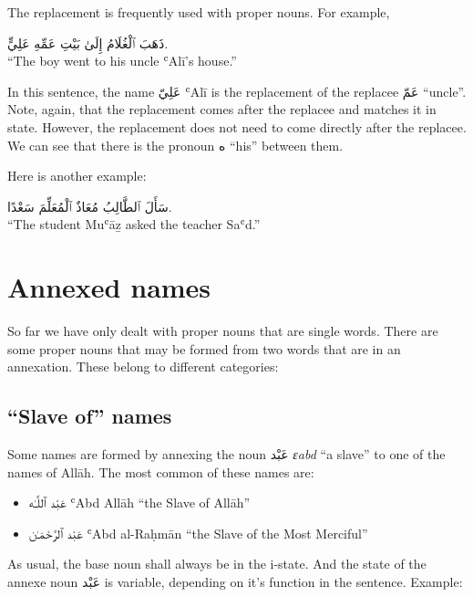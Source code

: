 \documentclass[
  10pt,
]{book}
\providecommand{\tightlist}{%
  \setlength{\itemsep}{0pt}\setlength{\parskip}{0pt}}
\begin{document}
The replacement is frequently used with proper nouns. For example,

\foreignlanguage{arabic}{ذَهَبَ ٱلْغُلَامُ إِلَىٰ بَيْتِ عَمِّهِ عَلِيٍّ.}\\
\enquote{The boy went to his uncle ʿAlī's house.}

In this sentence, the name \foreignlanguage{arabic}{عَلِيّ} ʿAlī is the replacement of the replacee \foreignlanguage{arabic}{عَمّ} \enquote{uncle}. Note, again, that the replacement comes after the replacee and matches it in state. However, the replacement does not need to come directly after the replacee. We can see that there is the pronoun \foreignlanguage{arabic}{ه} \enquote{his} between them.

Here is another example:

\foreignlanguage{arabic}{سَأَلَ ٱلطَّالِبُ مُعَاذٌ ٱلْمُعَلِّمَ سَعْدًا.}\\
\enquote{The student Muʿāẕ asked the teacher Saʿd.}

\section{Annexed names}\label{annexed-names}

So far we have only dealt with proper nouns that are single words. There are some proper nouns that may be formed from two words that are in an annexation. These belong to different categories:

\subsection{\texorpdfstring{\enquote{Slave of} names}{``Slave of'' names}}\label{slave-of-names}

Some names are formed by annexing the noun \foreignlanguage{arabic}{عَبْد} \emph{ɛabd} \enquote{a slave} to one of the names of Allāh. The most common of these names are:

\begin{itemize}
\tightlist
\item
  \foreignlanguage{arabic}{عَبْد ٱللَّـٰه} ʿAbd Allāh \enquote{the Slave of Allāh}
\item
  \foreignlanguage{arabic}{عَبْد ٱلرَّحْمَـٰن} ʿAbd al-Raḥmān \enquote{the Slave of the Most Merciful}
\end{itemize}

As usual, the base noun shall always be in the i-state. And the state of the annexe noun \foreignlanguage{arabic}{عَبْد} is variable, depending on it's function in the sentence. Example:
\end{document}
